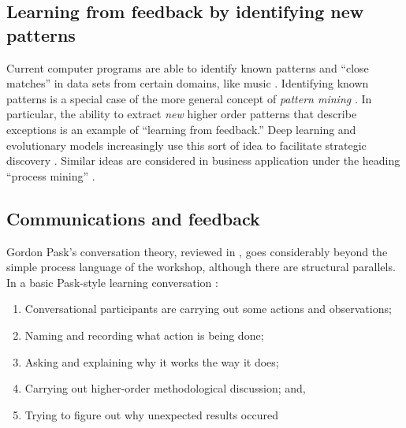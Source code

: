 \subsection{Learning from feedback by identifying new patterns}

Current computer programs are able to identify known patterns and
``close matches'' in data sets from certain domains, like music
\cite{meredith2002algorithms}.  Identifying known patterns is a
special case of the more general concept of \emph{pattern mining}
\cite{bergeron2007representation}.  In particular, the ability to
extract \emph{new} higher order patterns that describe exceptions is
an example of ``learning from feedback.''  Deep learning and
evolutionary models increasingly use this sort of idea to facilitate
strategic discovery \cite{samothrakis2011approximating}.  Similar
ideas are considered in business application under the heading
``process mining'' \cite{van2011process}.

\subsection{Communications and feedback}

Gordon Pask's conversation theory, reviewed in
\cite{conversation-theory-review,boyd2004conversation}, goes
considerably beyond the simple process language of the workshop,
although there are structural parallels.  In a basic Pask-style
learning conversation \cite[p. 190]{boyd2004conversation}: 

\begin{center}
\begin{fminipage}{.8\columnwidth}
\begin{minipage}{1\textwidth}
\begin{enumerate}[itemsep=0pt,rightmargin=10pt]
\item Conversational participants are carrying
out some actions and observations;
\item Naming and recording what action is being done;
\item Asking and explaining why it works the way
it does;
\item Carrying out higher-order methodological discussion; and, 
\item Trying to figure out why unexpected results occured
\end{enumerate}
\end{minipage}
\end{fminipage}
\end{center}

